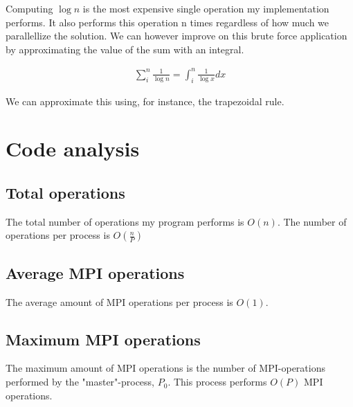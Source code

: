 \documentclass[paper=a4, fontsize=11pt]{scrartcl} %
\numberwithin{equation}{section} %
\numberwithin{figure}{section} %
\numberwithin{table}{section} %
\begin{document}
Computing $\log{n}$ is the most expensive single operation my implementation performs.
It also performs this operation n times regardless of how much we parallellize the solution.
We can however improve on this brute force application by approximating the value of the sum with an integral.

\begin{gather*}
    \sum_{i}^{n} \frac{1}{\log{n}} = \int_{i}^{n} \frac{1}{\log{x}} dx
\end{gather*}

We can approximate this using, for instance, the trapezoidal rule.



\section{Code analysis}

\subsection{Total operations}

The total number of operations my program performs is $O(n)$.
The number of operations per process is $O(\frac{n}{P})$

\subsection{Average MPI operations}

The average amount of MPI operations per process is $O(1)$.

\subsection{Maximum MPI operations}

The maximum amount of MPI operations is the number of MPI-operations performed by the "master"-process, $P_0$.
This process performs $O(P)$ MPI operations.

\end{document}
